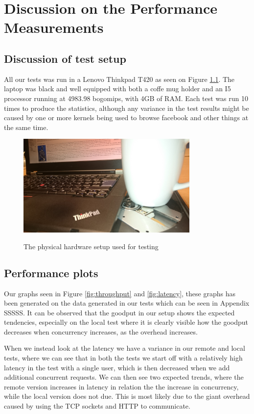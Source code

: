 \chapter{Discussion on the Performance Measurements}
\section{Discussion of test setup}
All our tests was run in a Lenovo Thinkpad T420 as seen on Figure \ref{fig:hardware}. The laptop was black and well equipped with both a coffe mug holder and an I5 processor running at 4983.98 bogomips, with 4GB of RAM. Each test was run 10 times to produce the statistics, although any variance in the test results might be caused by one or more kernels being used to browse facebook and other things at the same time.

\begin{figure}[H]
    \centering
    \includegraphics[width=0.8\textwidth]{hardware.jpg}
    \label{fig:hardware}
    \caption{The physical hardware setup used for testing}
\end{figure}


\section{Performance plots}
Our graphs seen in Figure \ref{fig:throughput} and \ref{fig:latency}, these graphs has been generated on the data generated in our tests which can be seen in Appendix SSSSS. It can be observed that the goodput in our setup shows the expected tendencies, especially on the local test where it is clearly visible how the goodput decreases when concurrency increases, as the overhead increases.

When we instead look at the latency we have a variance in our remote and local tests, where we can see that in both the tests we start off with a relatively high latency in the test with a single user, which is then decreased when we add additional concurrent requests. We can then see two expected trends, where the remote version increases in latency in relation the the increase in concurrency, while the local version does not due. This is most likely due to the giant overhead caused by using the TCP sockets and HTTP to communicate.

